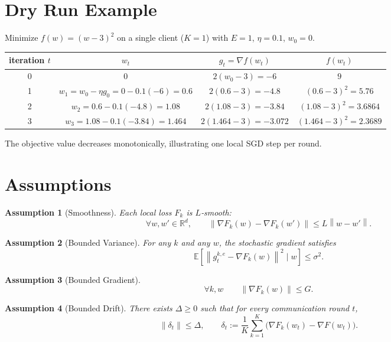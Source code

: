 \documentclass{article}
\newtheorem{assumption}{Assumption}
\newcommand{\E}{\mathbb{E}}
\newcommand{\R}{\mathbb{R}}
\newcommand{\norm}[1]{\left\|#1\right\|}
\begin{document}
\section*{Dry Run Example}
Minimize $f(w)=(w-3)^2$ on a single client ($K=1$) with $E=1$, $\eta=0.1$, $w_0=0$.

\begin{tabular}{c|c|c|c}
iteration $t$ & $w_t$ & $g_t=\nabla f(w_t)$ & $f(w_t)$\\\hline
0 & $0$ & $2(w_0-3)=-6$ & $9$\\
1 & $w_1=w_0-\eta g_0=0-0.1(-6)=0.6$ & $2(0.6-3)=-4.8$ & $(0.6-3)^2=5.76$\\
2 & $w_2=0.6-0.1(-4.8)=1.08$ & $2(1.08-3)=-3.84$ & $(1.08-3)^2=3.6864$\\
3 & $w_3=1.08-0.1(-3.84)=1.464$ & $2(1.464-3)=-3.072$ & $(1.464-3)^2=2.3689$
\end{tabular}

The objective value decreases monotonically, illustrating one local SGD step per round.

\newpage
\section*{Assumptions}
\begin{assumption}[Smoothness]\label{ass:smooth}
Each local loss $F_k$ is $L$‑smooth:
\[
\forall w,w'\in\R^d,\qquad
\norm{\nabla F_k(w)-\nabla F_k(w')}\le L\norm{w-w'}.
\]
\end{assumption}

\begin{assumption}[Bounded Variance]\label{ass:var}
For any $k$ and any $w$, the stochastic gradient satisfies
\[
\E\!\left[\norm{g_{t}^{k,e}-\nabla F_k(w)}^2\mid w\right]\le\sigma^2 .
\]
\end{assumption}

\begin{assumption}[Bounded Gradient]\label{ass:grad}
\[
\forall k,w\qquad \norm{\nabla F_k(w)}\le G .
\]
\end{assumption}

\begin{assumption}[Bounded Drift]\label{ass:drift}
There exists $\Delta\ge0$ such that for every communication round $t$,
\[
\norm{\delta_t} \le \Delta,\qquad 
\delta_t:=\frac1K\sum_{k=1}^K\bigl(\nabla F_k(w_t)-\nabla F(w_t)\bigr).
\]
\end{assumption}
\end{document}
